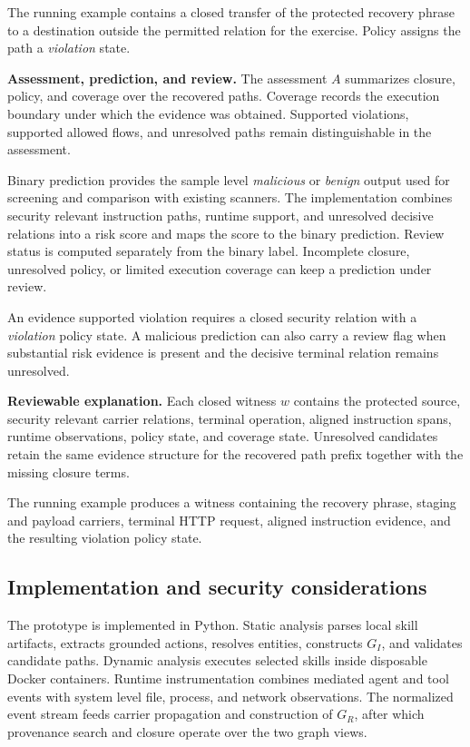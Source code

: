 The running example contains a closed transfer of the protected recovery
phrase to a destination outside the permitted relation for the exercise.
Policy assigns the path a \emph{violation} state.


\textbf{Assessment, prediction, and review.}
The assessment $A$ summarizes closure, policy, and coverage over the recovered
paths. Coverage records the execution boundary under which the evidence was
obtained. Supported violations, supported allowed flows, and unresolved paths
remain distinguishable in the assessment.

Binary prediction provides the sample level \emph{malicious} or
\emph{benign} output used for screening and comparison with existing scanners.
The implementation combines security relevant instruction paths, runtime
support, and unresolved decisive relations into a risk score and maps the
score to the binary prediction. Review status is computed separately from the
binary label. Incomplete closure, unresolved policy, or limited execution
coverage can keep a prediction under review.

An evidence supported violation requires a closed security relation with a
\emph{violation} policy state. A malicious prediction can also carry a review
flag when substantial risk evidence is present and the decisive terminal
relation remains unresolved.


\textbf{Reviewable explanation.}
Each closed witness $w$ contains the protected source, security relevant
carrier relations, terminal operation, aligned instruction spans, runtime
observations, policy state, and coverage state. Unresolved candidates retain
the same evidence structure for the recovered path prefix together with the
missing closure terms.

The running example produces a witness containing the recovery phrase, staging
and payload carriers, terminal HTTP request, aligned instruction evidence, and
the resulting violation policy state.

\subsection{Implementation and security considerations}
\label{sec:design-implementation}

The \system prototype is implemented in Python. Static analysis parses local
skill artifacts, extracts grounded actions, resolves entities, constructs
$G_I$, and validates candidate paths. Dynamic analysis executes selected skills
inside disposable Docker containers. Runtime instrumentation combines
mediated agent and tool events with system level file, process, and network
observations. The normalized event stream feeds carrier propagation and
construction of $G_R$, after which provenance search and closure operate over
the two graph views.

